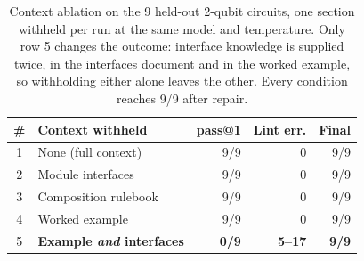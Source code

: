 \begin{table}[ht]
\centering
\caption{Context ablation on the 9 held-out 2-qubit circuits, one section withheld per run at the same model and temperature. Only row 5 changes the outcome: interface knowledge is supplied twice, in the interfaces document and in the worked example, so withholding either alone leaves the other. Every condition reaches 9/9 after repair.}
\label{tab:ablation}
\begin{tabular}{@{}clrrr@{}}
\toprule
\# & Context withheld & pass@1 & Lint err. & Final \\
\midrule
1 & None (full context) & 9/9 & 0 & 9/9 \\
2 & Module interfaces & 9/9 & 0 & 9/9 \\
3 & Composition rulebook & 9/9 & 0 & 9/9 \\
4 & Worked example & 9/9 & 0 & 9/9 \\
5 & \textbf{Example \emph{and} interfaces} & \textbf{0/9} & \textbf{5--17} & \textbf{9/9} \\
\bottomrule
\end{tabular}
\end{table}
